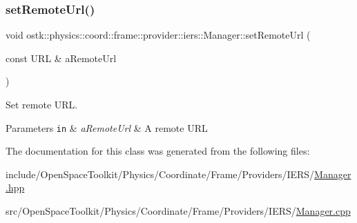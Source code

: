 \subsubsection{\texorpdfstring{set\+Remote\+Url()}{setRemoteUrl()}}
{\footnotesize\ttfamily void ostk\+::physics\+::coord\+::frame\+::provider\+::iers\+::\+Manager\+::set\+Remote\+Url (\begin{DoxyParamCaption}\item[{const U\+RL \&}]{a\+Remote\+Url }\end{DoxyParamCaption})}



Set remote U\+RL. 


\begin{DoxyParams}[1]{Parameters}
\mbox{\tt in}  & {\em a\+Remote\+Url} & A remote U\+RL \\
\hline
\end{DoxyParams}


The documentation for this class was generated from the following files\+:\begin{DoxyCompactItemize}
\item 
include/\+Open\+Space\+Toolkit/\+Physics/\+Coordinate/\+Frame/\+Providers/\+I\+E\+R\+S/\hyperlink{_coordinate_2_frame_2_providers_2_i_e_r_s_2_manager_8hpp}{Manager.\+hpp}\item 
src/\+Open\+Space\+Toolkit/\+Physics/\+Coordinate/\+Frame/\+Providers/\+I\+E\+R\+S/\hyperlink{_coordinate_2_frame_2_providers_2_i_e_r_s_2_manager_8cpp}{Manager.\+cpp}\end{DoxyCompactItemize}
